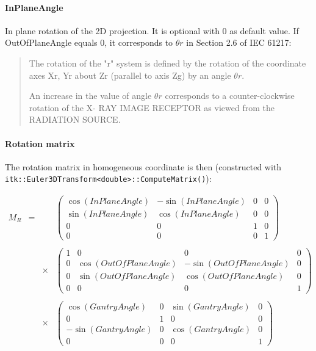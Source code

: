 \documentclass{article}
\newcommand{\biec}{\begin{quote}\begin{small}}
\newcommand{\eiec}{\end{small}\end{quote}}
\begin{document}
\paragraph{InPlaneAngle} 

In plane rotation of the 2D projection. It is optional with 0 as default value. If OutOfPlaneAngle equals 0, it corresponds to $\theta r$ in Section 2.6 of IEC 61217:


\biec
The rotation of the "r" system is defined by the rotation of the coordinate axes Xr, Yr about Zr (parallel to axis Zg) by an angle $\theta r$.

An increase in the value of angle $\theta r$ corresponds to a counter-clockwise rotation of the X- RAY IMAGE RECEPTOR as viewed from the RADIATION SOURCE.
\eiec

\paragraph{Rotation matrix}

The rotation matrix in homogeneous coordinate is then (constructed with\\ \verb+itk::Euler3DTransform<double>::ComputeMatrix()+):

$$
\begin{array}{lcll}
  M_R & = & & %
  \begin{pmatrix}
    \cos(InPlaneAngle) & -\sin(InPlaneAngle) & 0 & 0\\
    \sin(InPlaneAngle) & \cos(InPlaneAngle) & 0 & 0\\
    0 & 0 & 1 & 0\\
    0 & 0 & 0 & 1
  \end{pmatrix} \\
  \\ & & \times & %
  \begin{pmatrix}
    1 & 0 & 0 & 0\\
    0 & \cos(OutOfPlaneAngle) & -\sin(OutOfPlaneAngle) & 0\\
    0 & \sin(OutOfPlaneAngle) & \cos(OutOfPlaneAngle) & 0\\
    0 & 0 & 0 & 1
  \end{pmatrix} \\
  \\ & & \times & %
  \begin{pmatrix}
    \cos(GantryAngle) & 0 & \sin(GantryAngle) & 0 \\
    0 & 1 & 0 & 0 \\
    -\sin(GantryAngle) & 0 & \cos(GantryAngle) & 0 \\
    0 & 0 & 0 & 1
  \end{pmatrix}
\end{array}
$$
\end{document}
